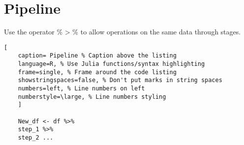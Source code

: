 \documentclass[11pt]{scrartcl} %
\begin{document}
\section{Pipeline}

Use the operator \% > \% to allow operations on the same data through stages.

\begin{lstlisting}[
	caption= Pipeline % Caption above the listing
	language=R, % Use Julia functions/syntax highlighting
	frame=single, % Frame around the code listing
	showstringspaces=false, % Don't put marks in string spaces
	numbers=left, % Line numbers on left
	numberstyle=\large, % Line numbers styling
	]

	New_df <- df %>%
	step_1 %>%
	step_2 ...
	
\end{lstlisting}







\end{document}
